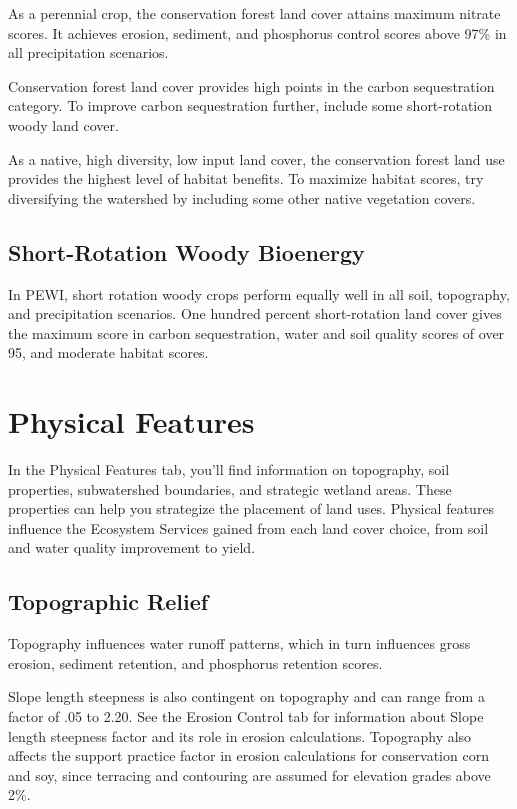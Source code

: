 \documentclass[11pt]{article}
\begin{document}
As a perennial crop, the conservation forest land cover attains maximum nitrate scores. It achieves erosion, sediment, and phosphorus control scores above 97\% in all precipitation scenarios. 

Conservation forest land cover provides high points in the carbon sequestration category. To improve carbon sequestration further, include some short-rotation woody land cover.

As a native, high diversity, low input land cover, the conservation forest land use provides the highest level of habitat benefits. To maximize habitat scores, try diversifying the watershed by including some other native vegetation covers.


\subsection{Short-Rotation Woody Bioenergy}
In PEWI, short rotation woody crops perform equally well in all soil, topography, and precipitation scenarios. One hundred percent short-rotation land cover gives the maximum score in carbon sequestration, water and soil quality scores of over 95, and moderate habitat scores.

\newpage
\section{Physical Features}\label{sec:physicalfeatures}
In the Physical Features tab, you'll find information on topography, soil properties, subwatershed boundaries, and strategic wetland areas. These properties can help you strategize the placement of land uses. Physical features influence the Ecosystem Services gained from each land cover choice, from soil and water quality improvement to yield.

\subsection{Topographic Relief}

Topography influences water runoff patterns, which in turn influences gross erosion, sediment retention, and phosphorus retention scores.

Slope length steepness is also contingent on topography and can range from a factor of .05 to 2.20. See the Erosion Control tab for information about Slope length steepness factor and its role in erosion calculations. Topography also affects the support practice factor in erosion calculations for conservation corn and soy, since terracing and contouring are assumed for elevation grades above 2\%. \cite{24}
\end{document}
